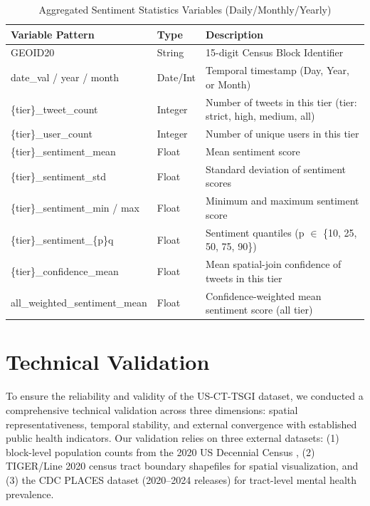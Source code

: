 \documentclass[fleqn,10pt]{wlscirep}
\begin{document}
\begin{table}[htbp]
\centering
\caption{Aggregated Sentiment Statistics Variables (Daily/Monthly/Yearly)}
\label{tab:agg_sentiment}
\begin{tabular}{llp{8cm}}
\toprule
\textbf{Variable Pattern} & \textbf{Type} & \textbf{Description} \\
\midrule
GEOID20 & String & 15-digit Census Block Identifier \\
date\_val / year / month & Date/Int & Temporal timestamp (Day, Year, or Month) \\
\{tier\}\_tweet\_count & Integer & Number of tweets in this tier (tier: strict, high, medium, all) \\
\{tier\}\_user\_count & Integer & Number of unique users in this tier \\
\{tier\}\_sentiment\_mean & Float & Mean sentiment score \\
\{tier\}\_sentiment\_std & Float & Standard deviation of sentiment scores \\
\{tier\}\_sentiment\_min / max & Float & Minimum and maximum sentiment score \\
\{tier\}\_sentiment\_\{p\}q & Float & Sentiment quantiles (p $\in$ \{10, 25, 50, 75, 90\}) \\
\{tier\}\_confidence\_mean & Float & Mean spatial-join confidence of tweets in this tier \\
all\_weighted\_sentiment\_mean & Float & Confidence-weighted mean sentiment score (all tier) \\
\bottomrule
\end{tabular}
\end{table}



\section*{Technical Validation}

To ensure the reliability and validity of the US-CT-TSGI dataset, we conducted a comprehensive technical validation across three dimensions: spatial representativeness, temporal stability, and external convergence with established public health indicators. Our validation relies on three external datasets: (1) block-level population counts from the 2020 US Decennial Census \cite{uscensusbureau2020decennial}, (2) TIGER/Line 2020 census tract boundary shapefiles \cite{uscensusbureau2020tigerline} for spatial visualization, and (3) the CDC PLACES dataset (2020--2024 releases) \cite{cdcplaces2024} for tract-level mental health prevalence.
\end{document}
